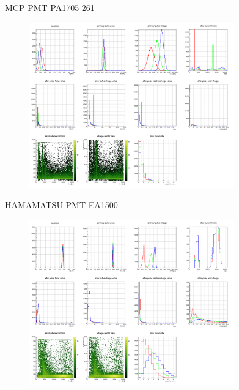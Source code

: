 \documentclass[11pt,compress,xcolor=x11names,UTF8]{beamer}
\begin{document}
\begin{frame}{MCP PMT PA1705-261 }
\vspace{-.4cm}
\begin{figure}
\centering
	\includegraphics[width=0.79\textwidth]{figure/PA1705-261_apstats}
\end{figure}

\end{frame}
\begin{frame}{HAMAMATSU PMT EA1500}
\vspace{-.4cm}
\begin{figure}
\centering
	\includegraphics[width=0.79\textwidth]{figure/EA1500_apstats}
\end{figure}

\end{frame}
\end{document}
